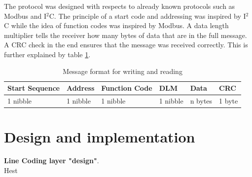 The protocol was designed with respects to already known protocols such as Modbus and I$^{2}$C. The principle of a start code and addressing was inspired by I$^{2}$C while the idea of function codes was inspired by Modbus. A data length multiplier tells the receiver how many bytes of data that are in the full message. A CRC check in the end ensures that the message was received correctly. This is further explained by table \ref{table:stdmsgtosensor}.
\begin{table}[H]
\centering
\begin{tabular}{|l|l|l|l|l|l|}
	\hline
	Start Sequence & Address & Function Code & DLM & Data & CRC  \\ \hline
	1 nibble & 1 nibble	& 1 nibble & 1 nibble & n bytes & 1 byte\\
	\hline
\end{tabular}
\caption{Message format for writing and reading}
\label{table:stdmsgtosensor}
\end{table}


\section{Design and implementation}
\textbf{Line Coding layer "design"}.\\
Hest

